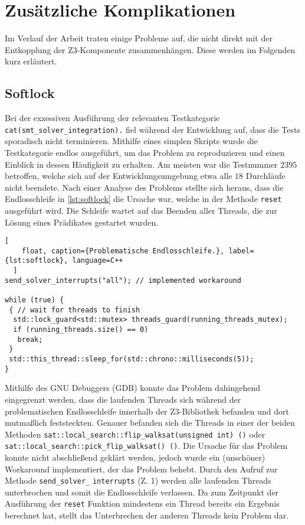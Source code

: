 
\section{Zusätzliche Komplikationen}

Im Verlauf der Arbeit traten einige Probleme auf, die nicht direkt mit der Entkopplung der Z3-Komponente zusammenhängen. Diese werden im Folgenden kurz erläutert.

\subsection{Softlock}
\label{subsec:softlock}

Bei der exzessiven Ausführung der relevanten Testkategorie \texttt{cat(smt\_solver\_integration).} fiel während der Entwicklung auf,
dass die Tests sporadisch nicht terminieren.
Mithilfe eines simplen Skripts wurde die Testkategorie endlos ausgeführt, um das Problem zu reproduzieren und einen Einblick in dessen Häufigkeit zu erhalten.
Am meisten war die Testnummer $2395$ betroffen, welche sich auf der Entwicklungsumgebung etwa alle $18$ Durchläufe nicht beendete.
Nach einer Analyse des Problems stellte sich heraus, dass die Endlosschleife in \cref{lst:softlock} die Ursache war, welche in der Methode \texttt{reset} ausgeführt wird.
Die Schleife wartet auf das Beenden aller Threads, die zur Lösung eines Prädikates gestartet wurden.

\begin{lstlisting}[
    float, caption={Problematische Endlosschleife.}, label={lst:softlock}, language=C++
  ]
send_solver_interrupts("all"); // implemented workaround

while (true) {
 { // wait for threads to finish
  std::lock_guard<std::mutex> threads_guard(running_threads_mutex);
  if (running_threads.size() == 0)
   break;
 }
 std::this_thread::sleep_for(std::chrono::milliseconds(5));
}
\end{lstlisting}

Mithilfe des GNU Debuggers (GDB) \cite{stallman1988debugging} konnte das Problem dahingehend eingegrenzt werden,
dass die laufenden Threads sich während der problematischen Endlosschleife innerhalb der Z3-Bibliothek befanden
und dort mutmaßlich feststeckten.
Genauer befanden sich die Threads in einer der beiden Methoden \texttt{sat::local\_search::flip\_walksat(unsigned int) ()} oder \texttt{sat::local\_search::pick\_flip\_walksat() ()}.
Die Ursache für das Problem konnte nicht abschließend geklärt werden, jedoch wurde ein (unschöner) Workaround implementiert, der das Problem behebt.
Durch den Aufruf zur Methode \texttt{send\_solver\_} \texttt{interrupts} (Z. 1) werden alle laufenden Threads unterbrochen und somit die Endlosschleife verlassen.
Da zum Zeitpunkt der Ausführung der \texttt{reset} Funktion mindestens ein Thread bereits ein Ergebnis berechnet hat, stellt das Unterbrechen der anderen Threads kein Problem dar.

